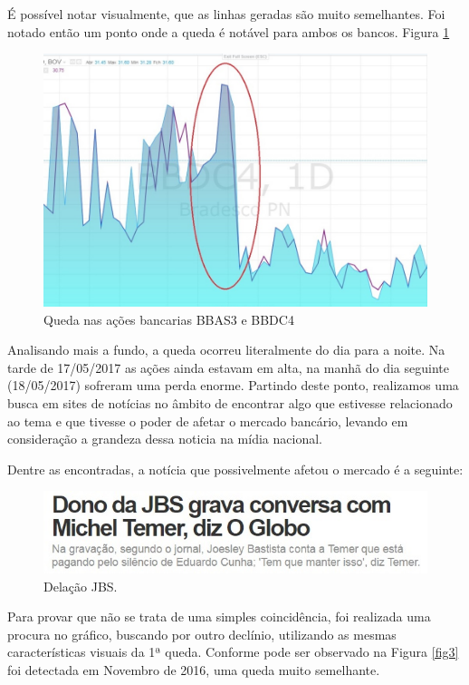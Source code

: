 \documentclass{sigchi}
\begin{document}
É possível notar visualmente, que as linhas geradas são muito semelhantes. Foi notado então um ponto onde a queda é notável para ambos os bancos. Figura \ref{fig2}


 \begin{figure}[!htb]
	\centering
	\includegraphics[scale=0.8]{./figures/figura5.jpg}
	\caption{Queda nas ações bancarias BBAS3 e BBDC4 }
	\label{fig2}
\end{figure}

Analisando mais a fundo, a queda ocorreu literalmente do dia para a noite. Na tarde de 17/05/2017 as ações ainda estavam em alta, na manhã do dia seguinte (18/05/2017) sofreram uma perda enorme. Partindo deste ponto, realizamos uma busca em sites de notícias no âmbito de encontrar algo que estivesse relacionado ao tema e que tivesse o poder de afetar o mercado bancário, levando em consideração a grandeza dessa noticia na mídia nacional.

 Dentre as encontradas, a notícia que possivelmente afetou o mercado é a seguinte:

\begin{figure}[!htb]
	\centering
	\includegraphics[scale=0.4]{./figures/figura3.jpg}
	\caption{Delação JBS.}
	\label{figRotu}
\end{figure}

Para provar que não se trata de uma simples coincidência, foi realizada uma procura no gráfico, buscando por outro declínio, utilizando as mesmas características visuais da 1ª queda. Conforme pode ser observado na Figura \ref{fig3} foi detectada em Novembro de 2016, uma queda muito semelhante.
\end{document}
